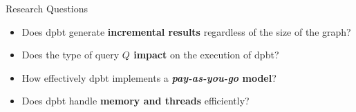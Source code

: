 


\begin{frame}[fragile]{Research Questions}
    \begin{itemize}
      \setlength\itemsep{2em}
        \item Does \acrshort{dpbt} generate \textbf{incremental results} regardless of the size of the graph?
        \item Does the type of query \textbf{$Q$ impact} on the execution of \acrshort{dpbt}?
        \item How effectively \acrshort{dpbt} implements a \textbf{\emph{pay-as-you-go} model}?
        \item Does \acrshort{dpbt} handle \textbf{memory and threads} efficiently?
    \end{itemize}        
\end{frame}

